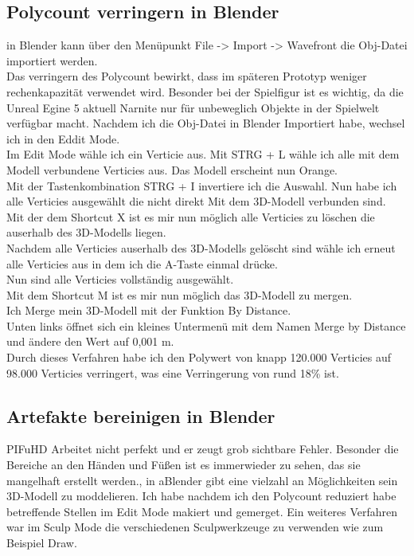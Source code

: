 \subsection{Polycount verringern in Blender}
in Blender kann über den Menüpunkt File -> Import -> Wavefront die Obj-Datei importiert werden. 
\\
Das verringern des Polycount bewirkt, dass im späteren Prototyp weniger rechenkapazität verwendet wird. Besonder bei der Spielfigur ist es wichtig, da die Unreal Egine 5 aktuell Narnite nur für unbeweglich Objekte in der Spielwelt verfügbar macht.
Nachdem ich die Obj-Datei in Blender Importiert habe, wechsel ich in den Eddit Mode.
\\
Im Edit Mode wähle ich ein Verticie aus. Mit STRG + L wähle ich alle mit dem Modell verbundene Verticies aus. Das Modell erscheint nun Orange.
\\
Mit der Tastenkombination STRG + I invertiere ich die Auswahl. Nun habe ich alle Verticies ausgewählt die nicht direkt Mit dem 3D-Modell verbunden sind.
\\
Mit der dem Shortcut X ist es mir nun möglich alle Verticies zu löschen die auserhalb des 3D-Modells liegen.
\\
Nachdem alle Verticies auserhalb des 3D-Modells gelöscht sind wähle ich erneut alle Verticies aus in dem ich die A-Taste einmal drücke.
\\
Nun sind alle Verticies vollständig ausgewählt.
\\
Mit dem Shortcut M ist es mir nun möglich das 3D-Modell zu mergen.
\\
Ich Merge mein 3D-Modell mit der Funktion By Distance.
\\
Unten links öffnet sich ein kleines Untermenü mit dem Namen Merge by Distance und ändere den Wert auf 0,001 m.
\\
Durch dieses Verfahren habe ich den Polywert von knapp 120.000 Verticies auf 98.000 Verticies verringert, was eine Verringerung von rund 18\% ist.
\subsection{Artefakte bereinigen in Blender}%
PIFuHD Arbeitet nicht perfekt und er zeugt grob sichtbare Fehler. Besonder die Bereiche an den Händen und Füßen ist es immerwieder zu sehen, das sie mangelhaft erstellt werden., in aBlender gibt eine vielzahl an Möglichkeiten sein 3D-Modell zu moddelieren. Ich habe nachdem ich den Polycount reduziert habe betreffende Stellen im Edit Mode makiert und gemerget. Ein weiteres Verfahren war im Sculp Mode die verschiedenen Sculpwerkzeuge zu verwenden wie zum Beispiel Draw.
